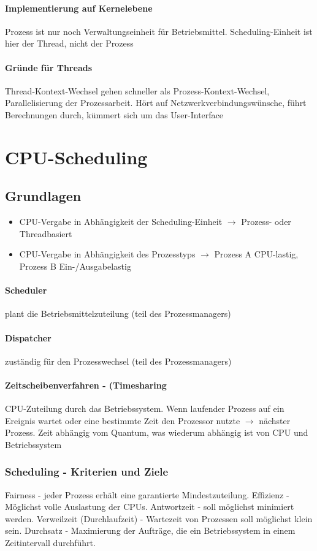 \documentclass[10pt,a4paper,landscape]{article}
\begin{document}
\begin{multicols*}{3}
	\paragraph{Implementierung auf Kernelebene} Prozess ist nur noch Verwaltungseinheit für Betriebsmittel. Scheduling-Einheit ist hier der Thread, nicht der Prozess
	\paragraph{Gründe für Threads} Thread-Kontext-Wechsel gehen schneller als Prozess-Kontext-Wechsel, Parallelisierung der Prozessarbeit. Hört auf Netzwerkverbindungswünsche, führt Berechnungen durch, kümmert sich um das User-Interface
	\section{CPU-Scheduling}
	\subsection{Grundlagen}
	\begin{itemize}
		\item CPU-Vergabe in Abhängigkeit der Scheduling-Einheit $\rightarrow$ Prozess- oder Threadbasiert
		\item CPU-Vergabe in Abhängigkeit des Prozesstyps $\rightarrow$ Prozess A CPU-lastig, Prozess B Ein-/Ausgabelastig
	\end{itemize}
	\paragraph{Scheduler} plant die Betriebsmittelzuteilung (teil des Prozessmanagers)
	\paragraph{Dispatcher} zuständig für den Prozesswechsel (teil des Prozessmanagers)
	\paragraph{Zeitscheibenverfahren - (Timesharing} CPU-Zuteilung durch das Betriebssystem. Wenn laufender Prozess auf ein Ereignis wartet oder eine bestimmte Zeit den Prozessor nutzte $\rightarrow$ nächster Prozess. Zeit abhängig vom Quantum, was wiederum abhängig ist von CPU und Betriebssystem
	\subsubsection{Scheduling - Kriterien und Ziele}
	Fairness - jeder Prozess erhält eine garantierte Mindestzuteilung. Effizienz - Möglichst volle Auslastung der CPUs. Antwortzeit - soll möglichst minimiert werden. Verweilzeit (Durchlaufzeit) - Wartezeit von Prozessen soll möglichst klein sein. Durchsatz - Maximierung der Aufträge, die ein Betriebssystem in einem Zeitintervall durchführt.

\end{multicols*}
\end{document}
